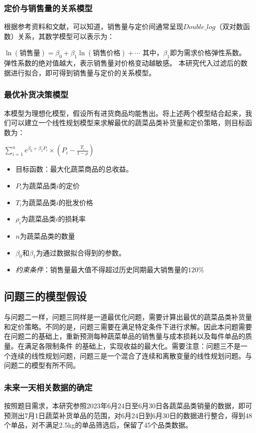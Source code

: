 \documentclass{article}
\begin{document}
\subsubsection{定价与销售量的关系模型}
根据参考资料和文献，可以知道，销售量与定价间通常呈现$Double\_log$（双对数函数）关系，其数学模型可以表示为：

$\ln(\text{销售量}) = \beta_0 + \beta_1 \ln(\text{销售价格}) + \cdots$
其中，$\beta_1$即为需求价格弹性系数。弹性系数的绝对值越大，表示销售量对价格变动越敏感。
本研究代入过滤后的数据进行拟合，即可得到销售量与定价的关系模型。

\subsubsection{最优补货决策模型}
本模型为理想化模型，假设所有进货商品均能售出。将上述两个模型结合起来，我们可以建立一个线性规划模型来求解最优的蔬菜品类补货量和定价策略，则目标函数为：

$ \sum_{i=1}^{n}e^{\beta_0 + \beta_1P_i} \times (P_i -\frac{T_i}{1-\rho} )$
\begin{itemize}
    \item 目标函数：最大化蔬菜商品的总收益。
    \item $P_i$为蔬菜品类$i$的定价
    \item $T_i$为蔬菜品类$i$的批发价格
    \item $\rho_i$为蔬菜品类$i$的损耗率
    \item $n$为蔬菜品类的数量
    \item $\beta_0$和$\beta_1$为通过数据拟合得到的参数。
    \item \textit{约束条件}：销售量最大值不得超过历史同期最大销售量的$120\%$
\end{itemize}

\subsection{问题三的模型假设}
与问题二一样，问题三同样是一道最优化问题，需要计算出最优的蔬菜品类补货量和定价策略。不同的是，问题三需要在满足特定条件下进行求解。因此本问题需要在问题二的基础上，重新预测每种蔬菜单品的销售量与成本损耗以及每件单品的质量。在满足各限制条件
的基础上，实现收益的最大化。需要注意：问题三不是一个连续的线性规划问题，问题三是一个混合了连续和离散变量的线性规划问题。与问题二的模型有所不同。

\subsubsection{未来一天相关数据的确定}
按照题目需求，本研究参照2023年6月24日至6月30日各蔬菜品类销量的数据，即可预测出7月1日蔬菜补货单品的范围，对6月24日到6月30日的数据进行整合，得到48个单品，对不满足2.5kg的单品筛选后，保留了45个品类数据。
\end{document}
